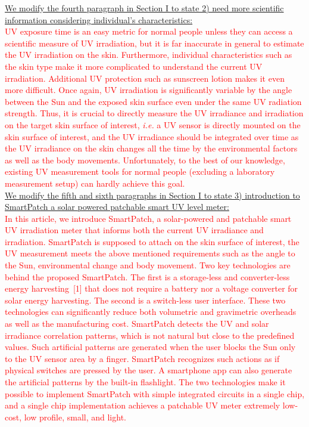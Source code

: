 \documentclass[onecolumn]{IEEEconf}
\begin{document}
\begin{description}
\uline{We modify the fourth paragraph in Section I to state 2) need more scientific information considering individual's characteristics:}\\
%
\textcolor{red}{UV exposure time is an easy metric for normal people unless they can access a scientific measure of UV irradiation, but it is far inaccurate in general to estimate the UV irradiation on the skin. Furthermore, individual characteristics such as the skin type make it more complicated to understand the current UV irradiation. Additional UV protection such as sunscreen lotion makes it even more difficult. Once again, UV irradiation is significantly variable by the angle between the Sun and the exposed skin surface even under the same UV radiation strength. Thus, it is crucial to directly measure the UV irradiance and irradiation on the target skin surface of interest, \textit{i.e.} a UV sensor is directly mounted on the skin surface of interest, and the UV irradiance should be integrated over time as the UV irradiance on the skin changes all the time by the environmental factors as well as the body movements. Unfortunately, to the best of our knowledge, existing UV measurement tools for normal people (excluding a laboratory measurement setup) can hardly achieve this goal.}\\

\uline{We modify the fifth and sixth paragraphs in Section I to state 3) introduction to SmartPatch a solar powered patchable smart UV level meter:}\\
%
\textcolor{red}{In this article, we introduce SmartPatch, a solar-powered and patchable smart UV irradiation meter that informs both the current UV irradiance and irradiation. SmartPatch is supposed to attach on the skin surface of interest, the UV measurement meets the above mentioned requirements such as the angle to the Sun, environmental change and body movement. Two key technologies are behind the proposed SmartPatch. The first is a storage-less and converter-less energy harvesting~[1] that does not require a battery nor a voltage converter for solar energy harvesting. The second is a switch-less user interface. These two technologies can significantly reduce both volumetric and gravimetric overheads as well as the manufacturing cost.
SmartPatch detects the UV and solar irradiance correlation patterns, which is not natural but close to the predefined values. Such artificial patterns are generated when the user blocks the Sun only to the UV sensor area by a finger. SmartPatch recognizes such actions as if physical switches are pressed by the user. A smartphone app can also generate the artificial patterns by the built-in flashlight. The two technologies make it possible to implement SmartPatch with simple integrated circuits in a single chip, and a single chip implementation achieves a patchable UV meter extremely low-cost, low profile, small, and light.}
 

\end{description}
\end{document}
